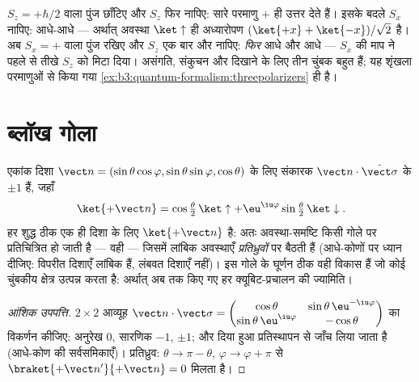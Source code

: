 \begin{example}[शृंखलाबद्ध श्टर्न--गेरलाख छन्ने]\label{ex:b3:spin-two-level:chained}
$S_z = +\hbar/2$ वाला पुंज छाँटिए और $S_z$ फिर नापिए: सारे
परमाणु $+$ ही उत्तर देते हैं। इसके बदले $S_x$ नापिए: आधे-आधे --- अर्थात्
अवस्था $\ket\uparrow$ ही अध्यारोपण $(\ket{+x} + \ket{-x})/\sqrt2$ है।
अब $S_x = +$ वाला पुंज रखिए और $S_z$ एक बार और नापिए: \emph{फिर} आधे
और आधे --- $S_x$ की माप ने पहले से तीखे $S_z$ को मिटा दिया।
असंगति, संकुचन और  दिखाने के लिए तीन चुंबक बहुत हैं; यह
शृंखला परमाणुओं से किया गया
\cref{ex:b3:quantum-formalism:threepolarizers} ही है।
\end{example}

\section{ब्लॉख गोला}

\begin{proposition}[किसी भी अक्ष के अनुदिश चक्रण]\label{prop:b3:spin-two-level:bloch}
एकांक दिशा $\vect n = (\sin\theta\cos\varphi,
\sin\theta\sin\varphi, \cos\theta)$ के लिए संकारक $\vect
n\cdot\hat{\vect\sigma}$ के  $\pm1$ हैं, जहाँ
\[
\ket{+\vect n} = \cos\tfrac\theta2\,\ket\uparrow +
\eu^{\iu\varphi}\sin\tfrac\theta2\,\ket\downarrow .
\]
हर शुद्ध  ठीक एक ही दिशा के लिए $\ket{+\vect n}$ है: अतः
अवस्था-समष्टि किसी गोले पर प्रतिचित्रित हो जाती है --- वही
\emph{} --- जिसमें लांबिक अवस्थाएँ \emph{प्रतिध्रुवों} पर
बैठती हैं (आधे-कोणों पर ध्यान दीजिए: विपरीत दिशाएँ लांबिक हैं, लंबवत
दिशाएँ नहीं)। इस गोले के घूर्णन ठीक वही विकास हैं जो कोई चुंबकीय क्षेत्र
उत्पन्न करता है: अर्थात् अब तक किए गए हर क्यूबिट-प्रचालन की ज्यामिति।
\end{proposition}

\begin{proof}[आंशिक उपपत्ति]
$2\times2$ आव्यूह $\vect n\cdot\vect\sigma =
\begin{pmatrix}\cos\theta & \sin\theta\,\eu^{-\iu\varphi}\\
\sin\theta\,\eu^{\iu\varphi} & -\cos\theta\end{pmatrix}$ का विकर्णन
कीजिए: अनुरेख $0$,
सारणिक $-1$,  $\pm1$; और दिया हुआ 
प्रतिस्थापन से जाँच लिया जाता है (आधे-कोण की सर्वसमिकाएँ)। प्रतिध्रुव:
$\theta \to \pi -
\theta$, $\varphi \to \varphi + \pi$ से $\braket{+\vect
n'}{+\vect n} = 0$ मिलता है।
\end{proof}


